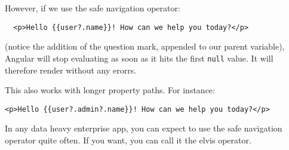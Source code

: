 However, if we use the safe navigation operator: 
\begin{lstlisting}
  <p>Hello {{user?.name}}! How can we help you today?</p>  
\end{lstlisting}

(notice the addition of the question mark, appended to our parent variable), 
Angular will stop evaluating as soon as it hits the first \lstinline{null}
value. It will therefore render without any erorrs.

This also works with longer property paths. For instance: 
\begin{lstlisting}
<p>Hello {{user?.admin?.name}}! How can we help you today?</p>    
\end{lstlisting}

In any data heavy enterprise app, you can expect to use the safe navigation
operator quite often. If you want, you can call it the elvis operator. 
